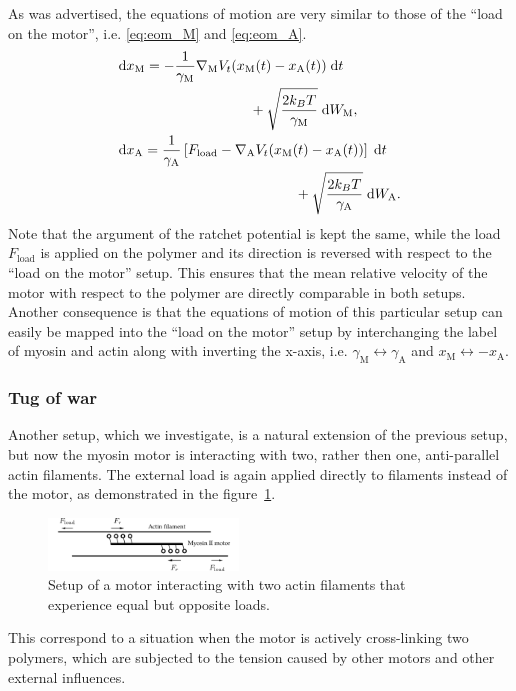 \documentclass[aps,pre,twocolumn,showpacs,showkeys,superscriptaddress,floatfix]{revtex4-1}
\newcommand{\rmd}{{\mathrm d}}
\begin{document}
As was advertised, the equations of motion are very similar to those of the ``load on the motor'', i.e. \eqref{eq:eom_M} and \eqref{eq:eom_A}.
\begin{align}
&\begin{multlined}[b][.42\textwidth]
\rmd x_\text{M} = 
- \frac{1}{\gamma_\text{M}} \nabla_\text{M} V_t(x_\text{M}(t) - x_\text{A}(t)) \; \rmd t 
\\ 
+ \sqrt{ \frac{2 k_B T}{\gamma_\text{M}} } \; \rmd W_\text{M} ,
\end{multlined}
\label{eq:eom_M_lp} \\
&\begin{multlined}[b][.42\textwidth]
\rmd x_\text{A} = 
\frac{1}{\gamma_\text{A}} \left[ F_\text{load} - \nabla_\text{A} V_t(x_\text{M}(t) - x_\text{A}(t)) \right] \; \rmd t 
\\
+ \sqrt{ \frac{2 k_B T}{\gamma_\text{A}} } \; \rmd W_\text{A} .
\end{multlined}
\label{eq:eom_A_lp}
\end{align}
Note that the argument of the ratchet potential is kept the same, 
while the load $F_\text{load}$ is applied on the polymer and its direction is reversed with respect to the ``load on the motor'' setup. 
This ensures that the mean relative velocity of the motor with respect to the polymer are directly comparable in both setups. 
Another consequence is that the equations of motion of this particular setup can easily be mapped into the ``load on the motor'' setup by interchanging the label of myosin and actin 
along with inverting the x-axis, 
i.e. $\gamma_\text{M}\leftrightarrow\gamma_\text{A}$ and $x_\text{M}\leftrightarrow - x_\text{A}$.


\subsubsection{Tug of war}
\label{sec:tug_of_war}
Another setup, which we investigate, is a natural extension of the previous setup, but now the myosin motor is interacting with two, rather then one, 
anti-parallel actin filaments. 
The external load is again applied directly to filaments instead of the motor, as demonstrated in the figure~\ref{fig:tug_F_illustration}. 
\begin{figure}[t]
\centering
\includegraphics[width=0.45\textwidth,height=!]{tug_F_illustration}
\caption{
\label{fig:tug_F_illustration}
Setup of a motor interacting with two actin filaments that experience equal but opposite loads.
}
\end{figure}
This correspond to a situation when the motor is actively cross-linking two polymers, which are subjected to the tension caused by other motors and other external influences.  
\end{document}
